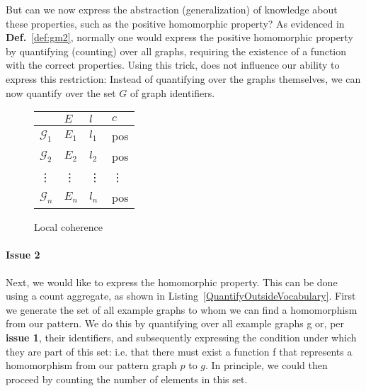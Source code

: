 \documentclass{article}
\theoremstyle{definition}
\newcommand{\graph}[1]{\ensuremath{\mathcal{#1}}}
\newcommand{\matthias}[1]{\textcolor{blue}{\marginpar{\sc Matthias} #1}}
\begin{document}

But can we now express the abstraction (generalization) of knowledge about these properties, such as the positive homomorphic property?
As evidenced in \textbf{Def.}~\ref{def:gm2}, normally one would express the positive homomorphic property by quantifying (counting) over all graphs, requiring the existence of a function with the correct properties.
Using this trick, does not influence our ability to express this restriction: Instead of quantifying over the graphs themselves, we can now quantify over the set $G$ of graph identifiers.

\begin{figure}[h]
\centering
\begin{tabular}{l |l l l}
         & $E$ & $l$      & $c$ \\
\hline
$\graph{G}_{1}$  & $E_{1}$ & $l_{1}$ & pos\\
$\graph{G}_{2}$  & $E_{2}$ & $l_{2}$ & pos\\
  \vdots & \vdots  & \vdots  & \vdots\\
$\graph{G}_{n}$  & $E_{n}$ & $l_{n}$ & pos\\
\end{tabular}
\caption{Local coherence\label{fig:LocalCoherence}}
\end{figure}



\paragraph{Issue 2}
Next, we would like to express the homomorphic property.
This can be done using a count aggregate, as shown in Listing~\ref{QuantifyOutsideVocabulary}.
First we generate the set of all example graphs to whom we can find a homomorphism from our pattern.
We do this by quantifying over all example graphs g or, per \textbf{issue 1}, their identifiers, and subsequently 
expressing the condition under which they are part of this set: i.e. that there must exist a function f that represents a homomorphism from our pattern graph $p$ to $g$.
In principle, we could then proceed by counting the number of elements in this set.
\end{document}
